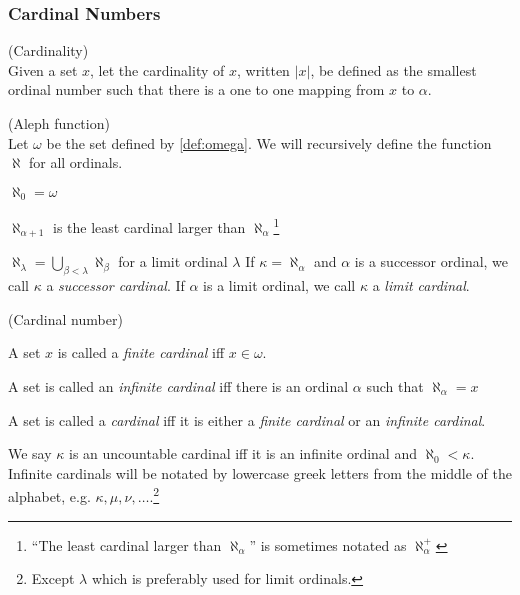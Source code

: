 \subsubsection{Cardinal Numbers}

\begin{definition}{(Cardinality)}\\
Given a set $x$, let the cardinality of $x$, written $|x|$, be defined as the smallest ordinal number such that there is a one to one mapping from $x$ to $\alpha$.
\end{definition}

\begin{definition}{(Aleph function)}\label{def:aleph}\\
Let $\omega$ be the set defined by \ref{def:omega}.
We will recursively define the function $\aleph$ for all ordinals.
\bce[(i)]
\item $\aleph_0 = \omega$
\item $\aleph_{\alpha+1}$ is the least cardinal larger than $\aleph_\alpha$\footnote{``The least cardinal larger than $\aleph_\alpha$'' is sometimes notated as $\aleph_\alpha^{+}$}
\item $\aleph_\lambda = \bigcup_{\beta < \lambda}\aleph_\beta$ for a limit ordinal $\lambda$
\ece
If $\kappa = \aleph_\alpha$ and $\alpha$ is a successor ordinal, we call $\kappa$ a \emph{successor cardinal}. If $\alpha$ is a limit ordinal, we call $\kappa$ a \emph{limit cardinal}.
\end{definition} %

\begin{definition}{(Cardinal number)}\label{def:cardinal}\\
\bce[(i)]
\item A set $x$ is called a \emph{finite cardinal} iff $x \in \omega$.
\item A set is called an \emph{infinite cardinal} iff there is an ordinal $\alpha$ such that $\aleph_\alpha = x$
\item A set is called a \emph{cardinal} iff it is either a \emph{finite cardinal} or an \emph{infinite cardinal}.
\ece
\end{definition}
We say $\kappa$ is an uncountable cardinal iff it is an infinite ordinal and $\aleph_0 < \kappa$.
Infinite cardinals will be notated by lowercase greek letters from the middle of the alphabet, e.g. $\kappa, \mu, \nu, \ldots$.\footnote{Except $\lambda$ which is preferably used for limit ordinals.}

